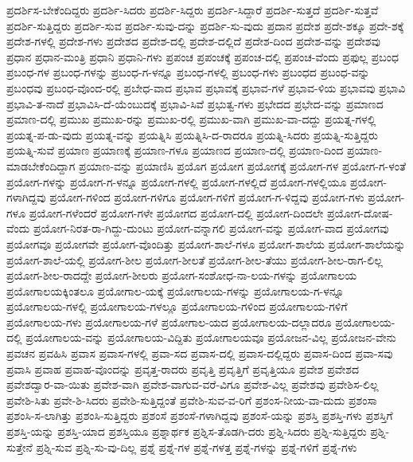 {ಪ್ರದರ್ಶಿಸ-ಬೇಕೆಂದಿದ್ದರು
ಪ್ರದರ್ಶಿ-ಸಿದರು
ಪ್ರದರ್ಶಿ-ಸಿದ್ದರು
ಪ್ರದರ್ಶಿ-ಸಿದ್ದಾರೆ
ಪ್ರದರ್ಶಿ-ಸುತ್ತದೆ
ಪ್ರದರ್ಶಿ-ಸುತ್ತವೆ
ಪ್ರದರ್ಶಿ-ಸುತ್ತಿದ್ದರು
ಪ್ರದರ್ಶಿ-ಸುವ
ಪ್ರದರ್ಶಿ-ಸುವು-ದನ್ನು
ಪ್ರದರ್ಶಿ-ಸು-ವುದು
ಪ್ರದಾನ
ಪ್ರದೇಶ
ಪ್ರದೇ-ಶಕ್ಕೂ
ಪ್ರದೇ-ಶಕ್ಕೆ
ಪ್ರದೇಶ-ಗಳಲ್ಲಿ
ಪ್ರದೇಶ-ಗಳು
ಪ್ರದೇಶದ
ಪ್ರದೇಶ-ದಲ್ಲಿ
ಪ್ರದೇಶ-ದಲ್ಲಿದೆ
ಪ್ರದೇಶ-ದಿಂದ
ಪ್ರದೇಶ-ವನ್ನು
ಪ್ರದೇಶವು
ಪ್ರಧಾನ
ಪ್ರಧಾನ-ಮಂತ್ರಿ
ಪ್ರಧಾನಿ
ಪ್ರಧಾನಿ-ಗಳು
ಪ್ರಪಂಚ
ಪ್ರಪಂಚಕ್ಕೆ
ಪ್ರಪಂಚ-ದಲ್ಲಿ
ಪ್ರಪಂಚ-ವೆಂದು
ಪ್ರಫುಲ್ಲ
ಪ್ರಬಂಧ
ಪ್ರಬಂಧ-ಗಳ
ಪ್ರಬಂಧ-ಗಳನ್ನು
ಪ್ರಬಂಧ-ಗ-ಳನ್ನೂ
ಪ್ರಬಂಧ-ಗಳಲ್ಲಿ
ಪ್ರಬಂಧ-ಗಳು
ಪ್ರಬಂಧದ
ಪ್ರಬಂಧ-ವನ್ನು
ಪ್ರಬಂಧವು
ಪ್ರಬಂಧ-ವೊಂದ-ರಲ್ಲಿ
ಪ್ರಬೇಧ-ವಾದ
ಪ್ರಭಾವ
ಪ್ರಭಾವಕ್ಕೆ
ಪ್ರಭಾವ-ಗಳೆ
ಪ್ರಭಾವ-ಳಿಯ
ಪ್ರಭಾವವು
ಪ್ರಭಾವಿ
ಪ್ರಭಾವಿ-ತ-ನಾದೆ
ಪ್ರಭಾವಿಸಿ-ದೆ-ಯೆಂಬುದಕ್ಕೆ
ಪ್ರಭಾವಿ-ಸಿವೆ
ಪ್ರಭುತ್ವ-ಗಳು
ಪ್ರಭೇದದ
ಪ್ರಭೇದ-ವನ್ನು
ಪ್ರಮಾಣದ
ಪ್ರಮಾಣ-ದಲ್ಲಿ
ಪ್ರಮುಖ
ಪ್ರಮುಖ-ರನ್ನು
ಪ್ರಮುಖ-ರಲ್ಲಿ
ಪ್ರಮುಖ-ವಾಗಿ
ಪ್ರಮುಖ-ವಾ-ದದ್ದು
ಪ್ರಯತ್ನ-ಗಳಲ್ಲಿ
ಪ್ರಯತ್ನ-ಪ-ಡು-ವುದು
ಪ್ರಯತ್ನ-ವನ್ನು
ಪ್ರಯತ್ನಿಸಿ
ಪ್ರಯತ್ನಿಸಿ-ದ-ರಾದರೂ
ಪ್ರಯತ್ನಿ-ಸಿದರು
ಪ್ರಯತ್ನಿ-ಸುತ್ತಿದ್ದರು
ಪ್ರಯತ್ನಿ-ಸುವೆ
ಪ್ರಯಾಣ
ಪ್ರಯಾಣಕ್ಕೆ
ಪ್ರಯಾಣ-ಗಳೂ
ಪ್ರಯಾಣದ
ಪ್ರಯಾಣ-ದಲ್ಲಿ
ಪ್ರಯಾಣ-ದಿಂದ
ಪ್ರಯಾಣ-ಮಾಡಬೇಕೆಂದಿದ್ದಾಗ
ಪ್ರಯಾಣ-ವನ್ನು
ಪ್ರಯಾಣಿಸಿ
ಪ್ರಯೊಗ
ಪ್ರಯೋಗ
ಪ್ರಯೋಗಕ್ಕೆ
ಪ್ರಯೋಗ-ಗಳ
ಪ್ರಯೋಗ-ಗ-ಳಂತೆ
ಪ್ರಯೋಗ-ಗಳನ್ನು
ಪ್ರಯೋಗ-ಗ-ಳನ್ನೂ
ಪ್ರಯೋಗ-ಗಳಲ್ಲಿ
ಪ್ರಯೋಗ-ಗಳಲ್ಲಿದೆ
ಪ್ರಯೋಗ-ಗಳಲ್ಲಿಯೂ
ಪ್ರಯೋಗ-ಗಳಾಗಿದ್ದವು
ಪ್ರಯೋಗ-ಗಳಿಂದ
ಪ್ರಯೋಗ-ಗಳಿಗೂ
ಪ್ರಯೋಗ-ಗಳಿಗೆ
ಪ್ರಯೋಗ-ಗ-ಳಿದ್ದವು
ಪ್ರಯೋಗ-ಗಳು
ಪ್ರಯೋಗ-ಗಳೂ
ಪ್ರಯೋಗ-ಗಳೆಂದರೆ
ಪ್ರಯೋಗ-ಗಳೇ
ಪ್ರಯೋಗದ
ಪ್ರಯೋಗ-ದಲ್ಲಿ
ಪ್ರಯೋಗ-ದಿಂದಲೇ
ಪ್ರಯೋಗ-ದೋಷ-ವೆಂದು
ಪ್ರಯೋಗ-ನಿರತ-ರಾ-ಗಿದ್ದು-ದುಂಟು
ಪ್ರಯೋಗ-ವನ್ನಾಗಲಿ
ಪ್ರಯೋಗ-ವನ್ನು
ಪ್ರಯೋಗ-ವಾದ
ಪ್ರಯೋಗವು
ಪ್ರಯೋಗವೂ
ಪ್ರಯೋಗವೇ
ಪ್ರಯೋಗ-ವೊಂದಿತ್ತು
ಪ್ರಯೋಗ-ಶಾಲೆ-ಗಳೂ
ಪ್ರಯೋಗ-ಶಾಲೆಯ
ಪ್ರಯೋಗ-ಶಾಲೆಯನ್ನು
ಪ್ರಯೋಗ-ಶಾಲೆ-ಯಲ್ಲಿ
ಪ್ರಯೋಗ-ಶೀಲ
ಪ್ರಯೋಗ-ಶೀಲತೆ
ಪ್ರಯೋಗ-ಶೀಲ-ತೆಯು
ಪ್ರಯೋಗ-ಶೀಲ-ರಾಗ-ಲಿಲ್ಲ
ಪ್ರಯೋಗ-ಶೀಲ-ರಾದದ್ದೇ
ಪ್ರಯೋಗ-ಶೀಲರು
ಪ್ರಯೋಗ-ಸಂಶೋಧ-ನಾ-ಲಯ-ಗಳನ್ನು
ಪ್ರಯೋಗಾಲಯ
ಪ್ರಯೋಗಾಲಯಕ್ಕಿಂತಲೂ
ಪ್ರಯೋಗಾಲ-ಯಕ್ಕೆ
ಪ್ರಯೋಗಾಲಯ-ಗಳನ್ನು
ಪ್ರಯೋಗಾಲಯ-ಗ-ಳನ್ನೂ
ಪ್ರಯೋಗಾಲಯ-ಗಳಲ್ಲಿ
ಪ್ರಯೋಗಾಲಯ-ಗಳಲ್ಲೂ
ಪ್ರಯೋಗಾಲಯ-ಗಳಿಂದ
ಪ್ರಯೋಗಾಲಯ-ಗಳಿಗೆ
ಪ್ರಯೋಗಾಲಯ-ಗಳು
ಪ್ರಯೋಗಾಲಯ-ಗಳೆ
ಪ್ರಯೋಗಾಲ-ಯದ
ಪ್ರಯೋಗಾಲಯ-ದಲ್ಲಾದರೂ
ಪ್ರಯೋಗಾಲಯ-ದಲ್ಲಿ
ಪ್ರಯೋಗಾಲಯ-ವನ್ನು
ಪ್ರಯೋಗಾಲಯ-ವಿದ್ದಿತು
ಪ್ರಯೋಗಾಲಯವೂ
ಪ್ರಯೋಜನ-ವಿಲ್ಲ
ಪ್ರಯೋಜನ-ವೇನು
ಪ್ರವಚನ
ಪ್ರವಹಿಸಿ
ಪ್ರವಾಸ
ಪ್ರವಾಸ-ಗಳಲ್ಲಿ
ಪ್ರವಾ-ಸದ
ಪ್ರವಾಸ-ದಲ್ಲಿ
ಪ್ರವಾಸ-ದಲ್ಲಿದ್ದರು
ಪ್ರವಾಸ-ದಿಂದ
ಪ್ರವಾ-ಸವು
ಪ್ರವಾಸಿ
ಪ್ರವಾಹ
ಪ್ರವಾಹ-ವೊಂದನ್ನು
ಪ್ರವೃತ್ತ-ರಾದರು
ಪ್ರವೃತ್ತಿ
ಪ್ರವೃತ್ತಿಗೆ
ಪ್ರವೃತ್ತಿಯೂ
ಪ್ರವೇಶ
ಪ್ರವೇಶದ
ಪ್ರವೇಶದ್ವಾರ-ವಾ-ಯಿತು
ಪ್ರವೇಶ-ವಾಗಿ
ಪ್ರವೇಶ-ವಾಗುವ-ವರೆ-ವಿಗೂ
ಪ್ರವೇಶ-ವಿಲ್ಲ
ಪ್ರವೇಶವು
ಪ್ರವೇಶಿಸ-ಲಿಲ್ಲ
ಪ್ರವೇಶಿ-ಸಿತು
ಪ್ರವೇ-ಶಿ-ಸಿದರು
ಪ್ರವೇಶಿ-ಸುತ್ತಿದ್ದಂತೆ
ಪ್ರವೇಶಿ-ಸುವ-ವ-ರಿಗೆ
ಪ್ರಶಂಸ-ನೀಯ-ವಾ-ದುದು
ಪ್ರಶಂಸಾ
ಪ್ರಶಂಸಿ-ಸ-ಲಾಗಿತ್ತು
ಪ್ರಶಂಸಿ-ಸುತ್ತಿದ್ದರು
ಪ್ರಶಂಸೆ
ಪ್ರಶಂಸೆ-ಗಳಾಗಿದ್ದವು
ಪ್ರಶಂಸೆ-ಯನ್ನು
ಪ್ರಶಸ್ತಿ
ಪ್ರಶಸ್ತಿ-ಗಳು
ಪ್ರಶಸ್ತಿಗೆ
ಪ್ರಶಸ್ತಿ-ಯನ್ನು
ಪ್ರಶಸ್ತಿ-ಯಾದ
ಪ್ರಶಸ್ತಿಯೂ
ಪ್ರಶ್ನಾರ್ಥಕ
ಪ್ರಶ್ನಿಸ-ತೊಡಗಿ-ದರು
ಪ್ರಶ್ನಿ-ಸಿದರು
ಪ್ರಶ್ನಿ-ಸುತ್ತಿದ್ದರು
ಪ್ರಶ್ನಿ-ಸುತ್ತೇನೆ
ಪ್ರಶ್ನಿ-ಸುವ
ಪ್ರಶ್ನಿ-ಸು-ವು-ದಿಲ್ಲ
ಪ್ರಶ್ನೆ
ಪ್ರಶ್ನೆ-ಗಳ
ಪ್ರಶ್ನೆ-ಗಳತ್ತ
ಪ್ರಶ್ನೆ-ಗಳನ್ನು
ಪ್ರಶ್ನೆ-ಗಳಿಗೆ
ಪ್ರಶ್ನೆ-ಗಳು
}
